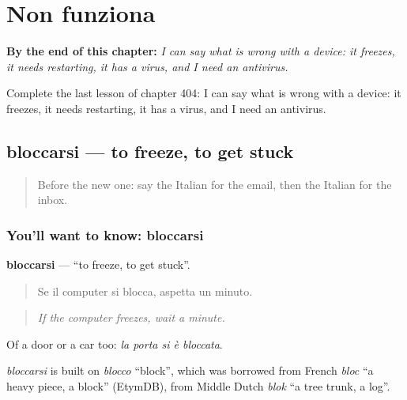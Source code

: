 
\chapter{Non funziona}
\label{ch:it-non-funziona}

\begin{chapteropening}
\textbf{By the end of this chapter:} \emph{I can say what is wrong with a device: it freezes, it needs restarting, it has a virus, and I need an antivirus.}

Complete the last lesson of chapter 404: I can say what is wrong with a device: it freezes, it needs restarting, it has a virus, and I need an antivirus.
\end{chapteropening}

\section[bloccarsi]{bloccarsi — to freeze, to get stuck}

\label{lesson:IT-C404-bloccarsi}



\begin{quote}
Before the new one: say the Italian for the email, then the Italian for the inbox.
\end{quote}

\subsection*{You'll want to know: bloccarsi}
\textbf{bloccarsi} — \textquotedblleft{}to freeze, to get stuck\textquotedblright{}.

\begin{quote}
Se il computer si blocca, aspetta un minuto.
\end{quote}

\begin{quote}
\emph{If the computer freezes, wait a minute.}
\end{quote}

Of a door or a car too: \emph{la porta si è bloccata}.

\begin{cousinweb}
\emph{bloccarsi} is built on \emph{blocco} \textquotedblleft{}block\textquotedblright{}, which was borrowed from French \emph{bloc} \textquotedblleft{}a heavy piece, a block\textquotedblright{} (EtymDB), from Middle Dutch \emph{blok} \textquotedblleft{}a tree trunk, a log\textquotedblright{}.
\end{cousinweb}

